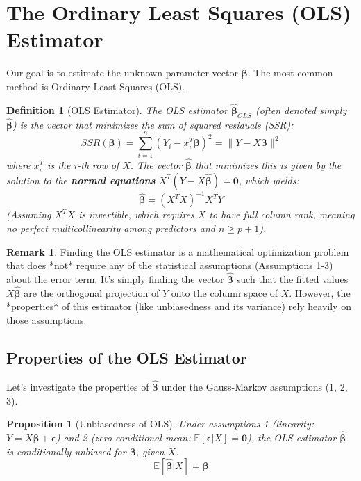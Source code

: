 \documentclass[11pt]{article}
\newtheorem{proposition}[theorem]{Proposition}
\newtheorem{definition}[theorem]{Definition}
\theoremstyle{definition}
\newtheorem{remark}[theorem]{Remark}
\newcommand{\E}{\mathbb{E}} %
\newcommand{\T}{^T} %
\newcommand{\bbeta}{\bm{\beta}} %
\newcommand{\bepsilon}{\bm{\epsilon}} %
\newcommand{\bZero}{\mathbf{0}} %
\newcommand{\bhat}[1]{\hat{\bm{#1}}} %
\begin{document}
\section{The Ordinary Least Squares (OLS) Estimator}
\label{sec:ols}

Our goal is to estimate the unknown parameter vector $\bbeta$. The most common method is Ordinary Least Squares (OLS).

\begin{definition}[OLS Estimator]
\label{def:ols}
The OLS estimator $\bhat{\beta}_{OLS}$ (often denoted simply $\bhat{\beta}$) is the vector that minimizes the sum of squared residuals (SSR):
\[ SSR(\bbeta) = \sum_{i=1}^n (Y_i - x_i\T \bbeta)^2 = \| Y - X\bbeta \|^2 \]
where $x_i\T$ is the $i$-th row of $X$.
The vector $\bhat{\beta}$ that minimizes this is given by the solution to the \textbf{normal equations} $X\T (Y - X\bhat{\beta}) = \bZero$, which yields:
\[ \bhat{\beta} = (X\T X)^{-1} X\T Y \]
(Assuming $X\T X$ is invertible, which requires $X$ to have full column rank, meaning no perfect multicollinearity among predictors and $n \ge p+1$).
\end{definition}

\begin{remark}
Finding the OLS estimator is a mathematical optimization problem that does *not* require any of the statistical assumptions (Assumptions 1-3) about the error term. It's simply finding the vector $\bhat{\beta}$ such that the fitted values $X\bhat{\beta}$ are the orthogonal projection of $Y$ onto the column space of $X$. However, the *properties* of this estimator (like unbiasedness and its variance) rely heavily on those assumptions.
\end{remark}

\subsection{Properties of the OLS Estimator}
\label{subsec:ols_properties}

Let's investigate the properties of $\bhat{\beta}$ under the Gauss-Markov assumptions (1, 2, 3).

\begin{proposition}[Unbiasedness of OLS]
\label{prop:ols_unbiased}
Under assumptions 1 (linearity: $Y=X\bbeta+\bepsilon$) and 2 (zero conditional mean: $\E[\bepsilon | X] = \bZero$), the OLS estimator $\bhat{\beta}$ is conditionally unbiased for $\bbeta$, given $X$.
\[ \E[\bhat{\beta} | X] = \bbeta \]
\end{proposition}
\end{document}
